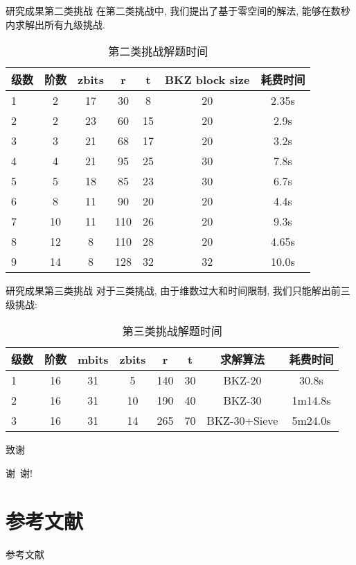 \documentclass[10pt,compress]{beamer}
\begin{document}
\begin{frame}{研究成果}{第二类挑战}
  在第二类挑战中, 我们提出了基于零空间的解法, 能够在数秒内求解出所有九级挑战. \\
  \pause
  \begin{table}
    \begin{tabular}{l | c | c | c | c | c | c }
      级数 &阶数 &zbits &r &t &BKZ block size &耗费时间 \\
      \hline \hline
      1 &2 &17 &30 &8 &20 &2.35s \\
      2 &2 &23 &60 &15 &20 &2.9s \\
      3 &3 &21 &68 &17 &20 &3.2s \\
      4 &4 &21 &95 &25 &30 &7.8s \\
      5 &5 &18 &85 &23 &30 &6.7s \\
      6 &8 &11 &90 &20 &20 &4.4s \\
      7 &10 &11 &110 &26 &20 &9.3s \\
      8 &12 &8 &110 &28 &20 &4.65s \\
      9 &14 &8 &128 &32 &32 &10.0s
    \end{tabular}
    \caption{第二类挑战解题时间}
  \end{table}
\end{frame}

\begin{frame}{研究成果}{第三类挑战}
  对于三类挑战, 由于维数过大和时间限制, 我们只能解出前三级挑战: \\
  \pause
  \begin{table}
    \begin{tabular}{l | c | c | c | c | c | c | c }
      级数 &阶数 &mbits &zbits &r &t &求解算法 &耗费时间 \\
      \hline \hline
      1 &16 &31 &5 &140 &30 &BKZ-20 &30.8s \\
      2 &16 &31 &10 &190 &40 &BKZ-30 &1m14.8s \\
      3 &16 &31 &14 &265 &70 &BKZ-30+Sieve &5m24.0s
    \end{tabular}
    \caption{第三类挑战解题时间}
  \end{table}
\end{frame}



\begin{frame}{致谢}
  \begin{center}
    \Huge 谢\ 谢!
  \end{center}
\end{frame}



\section{参考文献}

\begin{frame}[allowframebreaks]{参考文献}
  \nocite{*}
  \printbibliography[heading=none]
\end{frame}
\end{document}
